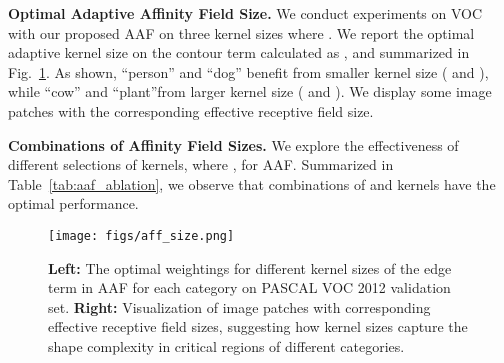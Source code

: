 \noindent
\textbf{Optimal Adaptive Affinity Field Size.}
We conduct experiments on VOC with our proposed AAF on three  kernel sizes where . We report the optimal adaptive kernel size on the contour term calculated as , and summarized in Fig.~\ref{fig:aff_size}. As shown, ``person'' and ``dog'' benefit from smaller kernel size ( and ), while ``cow'' and ``plant''from larger kernel size ( and ). We display some image patches with the corresponding effective receptive field size.

\noindent
\textbf{Combinations of Affinity Field Sizes.}
We explore the effectiveness of different selections of  kernels, where , for AAF. Summarized in Table~\ref{tab:aaf_ablation}, we observe that combinations of  and  kernels have the optimal performance. 

\begin{figure}[t]
    \centering
    \texttt{[image: figs/aff\_size.png]}
    \caption{{\bf Left:} The optimal weightings for different kernel sizes of the edge term in AAF for each category on PASCAL VOC 2012 validation set.  {\bf Right:} Visualization of image patches with corresponding effective receptive field sizes, suggesting how kernel sizes capture the shape complexity in critical regions of different categories.}
    \label{fig:aff_size}
\end{figure}

\begin{table*}[t]
  \centering
    \vspace{0.5pt}
    \caption{Per-category IOU results of AAF with different combinations of kernel sizes  on VOC 2012 validation set. `' denotes the inclusion of respective kernel size as opposed to `'.}
    \label{tab:aaf_ablation}
\end{table*}

